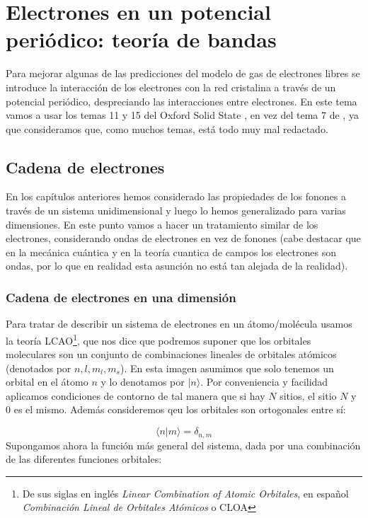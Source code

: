 \chapter{Electrones en un potencial periódico: teoría de bandas} \label{Ch:07}

Para mejorar algunas de las predicciones del modelo de gas de electrones libres se introduce la interacción de los electrones con la red cristalina a través de un potencial periódico, despreciando las interacciones entre electrones. En este tema vamos a usar los temas 11 y 15 del Oxford Solid State \cite{Oxford_Solid_State}, en vez del tema 7 de \cite{Fisica_del_Estado_Solido}, ya que consideramos que, como muchos temas, está todo muy mal redactado.

\section{Cadena de electrones}

En los capítulos anteriores hemos considerado las propiedades de los fonones a través de un sistema unidimensional y luego lo hemos generalizado para varias dimensiones. En este punto vamos a hacer un tratamiento similar de los electrones, considerando ondas de electrones en vez de fonones (cabe destacar que en la mecánica cuántica y en la teoría cuantica de campos los electrones son ondas, por lo que en realidad esta asunción no está tan alejada de la realidad).

\subsection{Cadena de electrones en una dimensión}

Para tratar de describir un sistema de electrones en un átomo/molécula usamos la teoría LCAO\footnote{De sus siglas en inglés \textit{Linear Combination of Atomic Orbitales}, en español \textit{Combinación Lineal de Orbitales Atómicos} o CLOA}, que nos dice que podremos suponer que los orbitales moleculares son un conjunto de combinaciones lineales de orbitales atómicos (denotados por $n,l,m_l,m_s$). En esta imagen asumimos que solo tenemos un orbital en el átomo $n$ y lo denotamos por $|n \rangle$. Por conveniencia y facilidad aplicamos condiciones de contorno de tal manera que si hay $N$ sitios, el sitio $N$ y $0$ es el mismo. Además consideremos qeu los orbitales son ortogonales entre sí:

\begin{equation}
	\langle n | m \rangle = \delta_{n,m}
\end{equation}
Supongamos ahora la función más general del sistema, dada por una combinación de las diferentes funciones orbitales:

